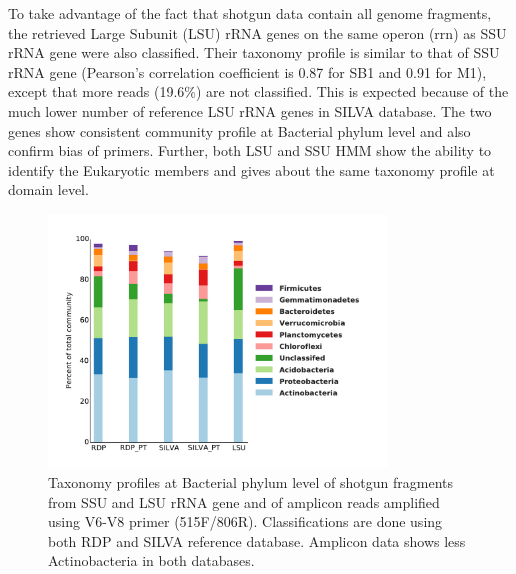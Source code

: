 \documentclass[12pt]{article}
\begin{document}
To take advantage of the fact that shotgun data contain all genome
fragments, the retrieved Large Subunit (LSU) rRNA genes on the same
operon (rrn) as SSU rRNA gene were also classified. Their taxonomy
profile is similar to that of SSU rRNA gene (Pearson’s correlation
coefficient is 0.87 for SB1 and 0.91 for M1), except that more reads
(19.6\%) are not classified. This is expected because of the much
lower number of reference LSU rRNA genes in SILVA database. The two
genes show consistent community profile at Bacterial phylum level and
also confirm bias of primers. Further, both LSU and SSU HMM show the
ability to identify the Eukaryotic members and gives about the same
taxonomy profile at domain level.

\begin{figure}[tbph!]
  \centering
  \includegraphics[width=0.8\textwidth]{figs/V6to8_SB1_taxa}

  \caption[Taxonomy profiles at Bacterial phylum level of shotgun
  fragments and of amplicon reads amplified using V6-V8
  primer]{Taxonomy profiles at Bacterial phylum level of shotgun
  fragments from SSU and LSU rRNA gene and of amplicon reads amplified
  using V6-V8 primer (515F/806R). Classifications are done using both
  RDP and SILVA reference database. Amplicon data shows less
  Actinobacteria in both databases.}

  \label{fig:V6to8_SB1_taxa}
\end{figure}
\end{document}
